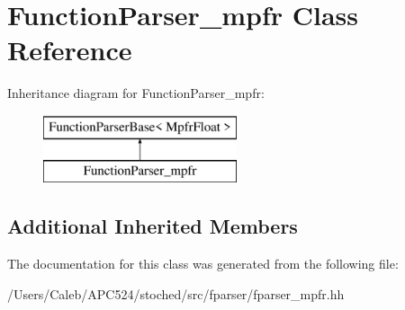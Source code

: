 \hypertarget{class_function_parser__mpfr}{}\section{Function\+Parser\+\_\+mpfr Class Reference}
\label{class_function_parser__mpfr}
Inheritance diagram for Function\+Parser\+\_\+mpfr\+:\begin{figure}[H]
\begin{center}
\leavevmode
\includegraphics[height=2.000000cm]{class_function_parser__mpfr}
\end{center}
\end{figure}
\subsection*{Additional Inherited Members}


The documentation for this class was generated from the following file\+:\begin{DoxyCompactItemize}
\item 
/\+Users/\+Caleb/\+A\+P\+C524/stoched/src/fparser/fparser\+\_\+mpfr.\+hh\end{DoxyCompactItemize}
